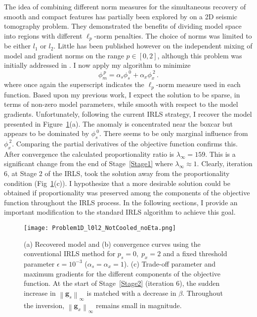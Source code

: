 The idea of combining different norm measures for the simultaneous recovery of smooth and compact features has partially been explored by \cite{SunLi14} on a 2D seismic tomography problem. They demonstrated the benefits of dividing model space into regions with different $\ell_p$-norm penalties. The choice of norms was limited to be either $l_1$ or $l_2$.
Little has been published however on the independent mixing of model and gradient norms on the range $p \in [0,2]$, although this problem was initially addressed in \cite[]{Fournier2015}.
I now apply my algorithm to minimize
\begin{equation}\label{mixNorm}
\phi_m^{\:p} = \alpha_s \phi_s^{\:0} + \alpha_x \phi_x^{\:2}\,.
\end{equation}
where once again the superscript indicates the $\ell_p$-norm measure used in each function.
Based upon my previous work, I expect the solution to be sparse, in terms of non-zero model parameters, while smooth with respect to the model gradients.
Unfortunately, following the current IRLS strategy, I recover the model presented in Figure~\ref{Mixed1DnoEta}(a). The anomaly is concentrated near the boxcar but appears to be dominated by $\phi_s^{\:0}$. There seems to be only marginal influence from $\phi_x^{\:2}$.
Comparing the partial derivatives of the objective function confirms this. After convergence the calculated proportionality ratio is $\lambda_\infty = 159$.
This is a significant change from the end of Stage~\ref{Stage1} where $\lambda_\infty \approx 1$. Clearly, iteration 6, at Stage 2 of the IRLS, took the solution away from the proportionality condition (Fig~\ref{Mixed1DnoEta}(c)).
I hypothesize that a more desirable solution could be obtained if proportionality was preserved among the components of the objective function throughout the IRLS process. In the following sections, I provide an important modification to the standard IRLS algorithm to achieve this goal.
\begin{figure}
\texttt{[image: Problem1D\_l0l2\_NotCooled\_noEta.png]}
\caption{(a) Recovered model and (b) convergence curves using the conventional IRLS method for $p_s=0,\;p_x=2$ and a fixed threshold parameter $\epsilon=10^{-3}$ ($\alpha_s=\alpha_x=1$). (c) Trade-off parameter and maximum gradients for the different components of the objective function. At the start of Stage~\ref{Stage2} (iteration 6), the sudden increase in $\left\| \mathbf{g}_s \right\|_\infty$ is matched with a decrease in $\beta$. Throughout the inversion, $\left\| \mathbf{g}_x \right\|_\infty$ remains small in magnitude.
}
\label{Mixed1DnoEta}
\end{figure}



